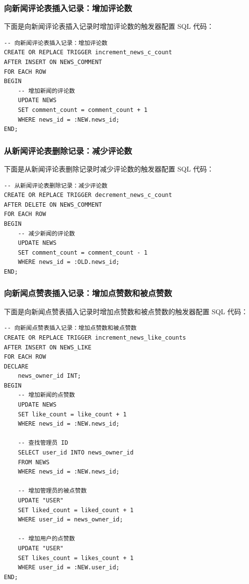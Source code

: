 \subsubsection{向新闻评论表插入记录：增加评论数}

下面是向新闻评论表插入记录时增加评论数的触发器配置 SQL 代码：

\begin{verbatim}
-- 向新闻评论表插入记录：增加评论数
CREATE OR REPLACE TRIGGER increment_news_c_count
AFTER INSERT ON NEWS_COMMENT
FOR EACH ROW
BEGIN
    -- 增加新闻的评论数
    UPDATE NEWS
    SET comment_count = comment_count + 1
    WHERE news_id = :NEW.news_id;
END;
\end{verbatim}

\subsubsection{从新闻评论表删除记录：减少评论数}

下面是从新闻评论表删除记录时减少评论数的触发器配置 SQL 代码：

\begin{verbatim}
-- 从新闻评论表删除记录：减少评论数
CREATE OR REPLACE TRIGGER decrement_news_c_count
AFTER DELETE ON NEWS_COMMENT
FOR EACH ROW
BEGIN
    -- 减少新闻的评论数
    UPDATE NEWS
    SET comment_count = comment_count - 1
    WHERE news_id = :OLD.news_id;
END;
\end{verbatim}

\subsubsection{向新闻点赞表插入记录：增加点赞数和被点赞数}

下面是向新闻点赞表插入记录时增加点赞数和被点赞数的触发器配置 SQL 代码：

\begin{verbatim}
-- 向新闻点赞表插入记录：增加点赞数和被点赞数
CREATE OR REPLACE TRIGGER increment_news_like_counts
AFTER INSERT ON NEWS_LIKE
FOR EACH ROW
DECLARE
    news_owner_id INT;
BEGIN
    -- 增加新闻的点赞数
    UPDATE NEWS
    SET like_count = like_count + 1
    WHERE news_id = :NEW.news_id;

    -- 查找管理员 ID
    SELECT user_id INTO news_owner_id
    FROM NEWS
    WHERE news_id = :NEW.news_id;

    -- 增加管理员的被点赞数
    UPDATE "USER"
    SET liked_count = liked_count + 1
    WHERE user_id = news_owner_id;

    -- 增加用户的点赞数
    UPDATE "USER"
    SET likes_count = likes_count + 1
    WHERE user_id = :NEW.user_id;
END;
\end{verbatim}


